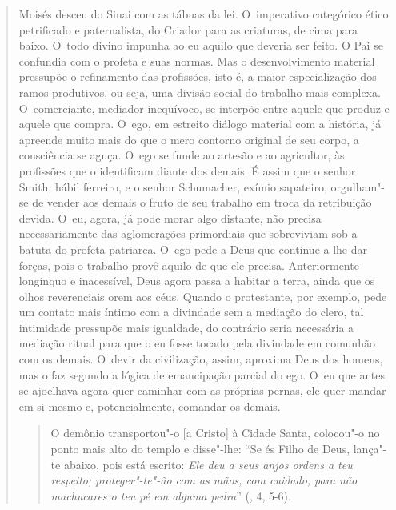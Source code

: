 {\begin{quote}
Moisés desceu do Sinai com as tábuas da lei. O~imperativo categórico
ético petrificado e paternalista, do Criador para as criaturas, de cima
para baixo. O~todo divino impunha ao eu aquilo que deveria ser feito. O
Pai se confundia com o profeta e suas normas. Mas o desenvolvimento
material pressupõe o refinamento das profissões, isto é, a maior
especialização dos ramos produtivos, ou seja, uma divisão social do
trabalho mais complexa. O~comerciante, mediador inequívoco, se interpõe
entre aquele que produz e aquele que compra. O~ego, em estreito diálogo
material com a história, já apreende muito mais do que o mero contorno
original de seu corpo, a consciência se aguça. O~ego se funde ao artesão
e ao agricultor, às profissões que o identificam diante dos demais. É
assim que o senhor Smith, hábil ferreiro, e o senhor Schumacher, exímio
sapateiro, orgulham"-se de vender aos demais o fruto de seu trabalho em
troca da retribuição devida. O~eu, agora, já pode morar algo distante,
não precisa necessariamente das aglomerações primordiais que sobreviviam
sob a batuta do profeta patriarca. O~ego pede a Deus que continue a lhe
dar forças, pois o trabalho provê aquilo de que ele precisa.
Anteriormente longínquo e inacessível, Deus agora passa a habitar a
terra, ainda que os olhos reverenciais orem aos céus. Quando o
protestante, por exemplo, pede um contato mais íntimo com a divindade
sem a mediação do clero, tal intimidade pressupõe mais igualdade, do
contrário seria necessária a mediação ritual para que o eu fosse tocado
pela divindade em comunhão com os demais. O~devir da civilização, assim,
aproxima Deus dos homens, mas o faz segundo a lógica de emancipação
parcial do ego. O~eu que antes se ajoelhava agora quer caminhar com as
próprias pernas, ele quer mandar em si mesmo e, potencialmente, comandar
os demais.

\begin{quote}
O demônio transportou"-o {[}a Cristo{]} à Cidade Santa, colocou"-o no
ponto mais alto do templo e disse"-lhe: ``Se és Filho de Deus, lança"-te
abaixo, pois está escrito: \emph{Ele deu a seus anjos ordens a teu
respeito; proteger"-te"-ão com as mãos, com cuidado, para não machucares o
teu pé em alguma pedra}'' (, 4, 5-6).
\end{quote}


\end{quote}}

